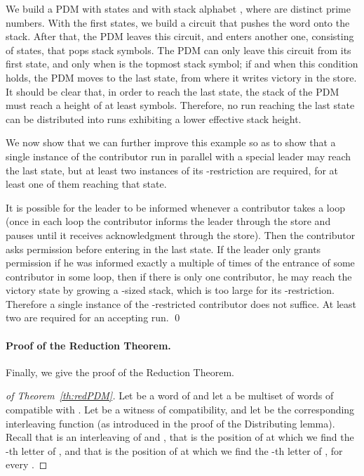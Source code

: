 \documentclass{llncs}
\begin{document}
\begin{definition}
\begin{example}
We build a PDM with  states and with stack alphabet , where  are distinct prime numbers. With the  first
states, we build a circuit that pushes the word  onto  the
stack. After that, the PDM leaves this circuit, and enters
another one, consisting of  states, that pops
 stack symbols. The PDM can only leave this circuit from its first state, and only when  is the topmost stack symbol; if and when this condition holds, the PDM moves to the last state, from where
it writes victory in the store. It should be clear that, in order to reach the last state, 
the stack of the PDM must reach a height of at least  symbols.
Therefore, no run reaching the last state can be distributed into runs exhibiting a lower effective stack height. 

We now show that we can further improve this example so as to show
that a single instance of the contributor run in parallel with a
special leader may reach the last state, but at least two instances of
its -restriction are required, for at least one of them reaching
that state.

It is possible for the leader to be informed whenever a contributor
takes a loop (once in each loop the contributor informs the leader
through the store and pauses until it receives acknowledgment through
the store). Then the contributor asks permission before entering in
the last state. If the leader only grants permission if he was
informed exactly a multiple of  times of the entrance of some
contributor in some loop, then if there is only one contributor, he
may reach the victory state by growing a -sized
stack, which is too large for its -restriction. Therefore a single
instance of the -restricted contributor does not suffice. At least
two are required for an accepting run. \qed
\end{example}

\paragraph{Proof of the Reduction Theorem.} Finally, we give the proof of the Reduction Theorem.

\begin{proof}[of Theorem~\ref{th:redPDM}]  Let  be a word of  and let  a be multiset of words of 
  compatible with . Let  be a witness of compatibility, and let  be the
  corresponding interleaving function (as introduced in the proof of the Distributing lemma). 
  Recall that  is an interleaving of  and , that  is the position of  at which we find   the -th letter of , and that  is the position of  at which we find the -th letter of ,
  for every .
  

\end{proof}
\end{definition}
\end{document}
